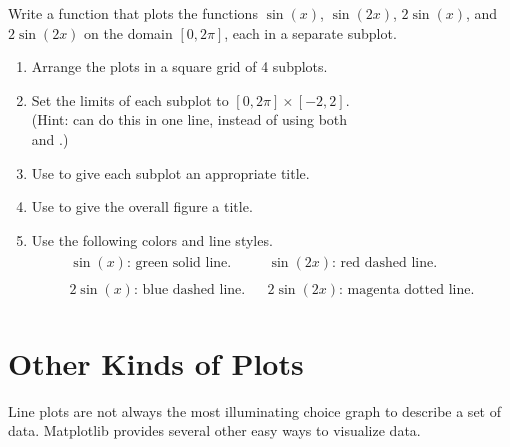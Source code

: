 \begin{problem} %
Write a function that plots the functions $\sin(x)$, $\sin(2x)$, $2\sin(x)$, and $2\sin(2x)$ on the domain $[0, 2\pi]$, each in a separate subplot.
\begin{enumerate}
    \item Arrange the plots in a square grid of 4 subplots.
    \item Set the limits of each subplot to $[0, 2\pi]\times[-2,2]$.
    \\(Hint:  can do this in one line, instead of using both
    \\ and .)
    \item Use  to give each subplot an appropriate title.
    \item Use  to give the overall figure a title.
    \item Use the following colors and line styles.
    \begin{align*}\begin{array}{rcl}
    \sin(x)\text{: green solid line.} && \sin(2x)\text{: red dashed line.}\\ \\
    2\sin(x)\text{: blue dashed line.} && 2\sin(2x)\text{: magenta dotted line.}
    \end{array}\end{align*}
\end{enumerate}
\end{problem}

\section*{Other Kinds of Plots} %

Line plots are not always the most illuminating choice graph to describe a set of data.
Matplotlib provides several other easy ways to visualize data.

